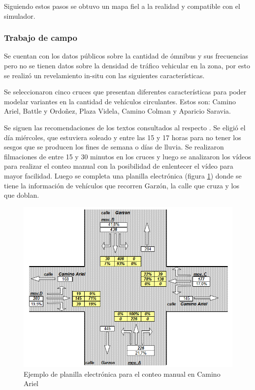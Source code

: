 Siguiendo estos pasos se obtuvo un mapa fiel a la realidad y compatible con el simulador.


\subsubsection{Trabajo de campo}
Se cuentan con los datos públicos sobre la cantidad de  ómnibus y sus frecuencias pero no se tienen datos sobre la densidad de tráfico vehicular en la zona, por esto se realizó un revelamiento in-situ con las siguientes características.

Se seleccionaron cinco cruces que presentan diferentes características para poder modelar variantes en la cantidad de vehículos circulantes.
Estos son: Camino Ariel, Battle y Ordoñez, Plaza Videla, Camino Colman y Aparicio Saravia. 

Se siguen las recomendaciones de los textos consultados al respecto \citep{ConteoTrafico}. Se eligió el día miércoles, que estuviera soleado y entre las 15 y 17 horas para no tener los sesgos que se producen los fines de semana o días de lluvia.
Se realizaron filmaciones de entre 15 y 30 minutos en los cruces y luego se analizaron los vídeos para realizar el conteo manual con la posibilidad de enlentecer el vídeo para mayor facilidad. Luego se completa una planilla electrónica (figura \ref{fig:conteo_hoja}) donde se tiene la información de vehículos que recorren Garzón, la calle que cruza y los que doblan. 

\begin{figure}[H]
	\centering
	\includegraphics[width=0.9\linewidth]{Figures/conteo_hoja}
	\caption{Ejemplo de planilla electrónica para el conteo manual en Camino Ariel}
	\label{fig:conteo_hoja}
\end{figure}



